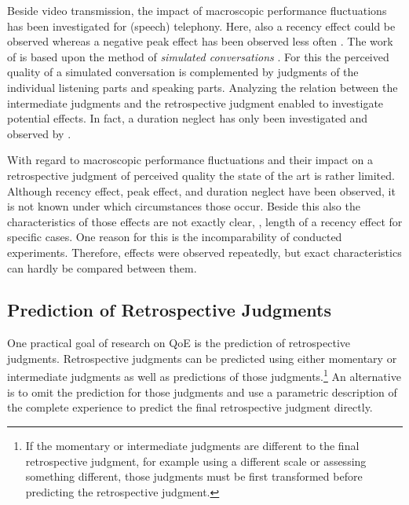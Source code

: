 Beside video transmission, the impact of macroscopic performance fluctuations has been investigated for (speech) telephony. %
Here, also a recency effect could be observed \citep[\eg,][]{rosenbluth_testing_1998, hamberg_time-varying_1999, gros_instantaneous_2001, gros_effects_2004, belmudez_audiovisual_2015, weiss_modeling_2009, lewcio_management_2014} whereas a negative peak effect has been observed less often \citep[\eg,][]{weiss_modeling_2009, belmudez_audiovisual_2015, lewcio_management_2014}.
The work of \citep{weiss_modeling_2009, lewcio_management_2014, belmudez_audiovisual_2015} is based upon the method of \emph{simulated conversations} \citep{etsi_speech_2011}.
For this the perceived quality of a simulated conversation is complemented by judgments of the individual listening parts and speaking parts.
Analyzing the relation between the intermediate judgments and the retrospective judgment enabled to investigate potential effects.
In fact, a duration neglect has only been investigated and observed by \citet{rosenbluth_testing_1998}.

With regard to macroscopic performance fluctuations and their impact on a retrospective judgment of perceived quality the state of the art is rather limited.
Although recency effect, peak effect, and duration neglect have been observed, it is not known under which circumstances those occur.
Beside this also the characteristics of those effects are not exactly clear, \eg, length of a recency effect for specific cases.
One reason for this is the incomparability of conducted experiments.
Therefore, effects were observed repeatedly, but exact characteristics can hardly be compared between them.

\subsection{Prediction of Retrospective Judgments}
One practical goal of research on \ac{QoE} is the prediction of retrospective judgments.
Retrospective judgments can be predicted using either momentary or intermediate judgments as well as predictions of those judgments.\footnote{If the momentary or intermediate judgments are different to the final retrospective judgment, for example using a different scale or assessing something different, those judgments must be first transformed before predicting the retrospective judgment.}
An alternative is to omit the prediction for those judgments and use a parametric description of the complete experience to predict the final retrospective judgment directly.

